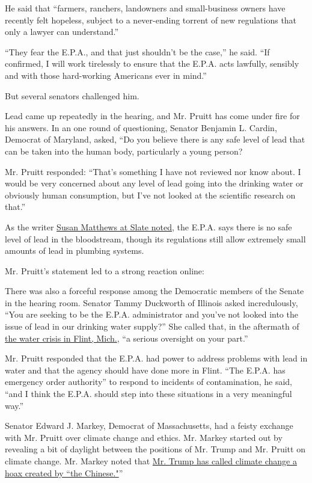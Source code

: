 He said that ``farmers, ranchers, landowners and small-business owners
have recently felt hopeless, subject to a never-ending torrent of new
regulations that only a lawyer can understand.''

``They fear the E.P.A., and that just shouldn't be the case,'' he said.
``If confirmed, I will work tirelessly to ensure that the E.P.A. acts
lawfully, sensibly and with those hard-working Americans ever in mind.''

But several senators challenged him.

Lead came up repeatedly in the hearing, and Mr. Pruitt has come under
fire for his answers. In an one round of questioning, Senator Benjamin
L. Cardin, Democrat of Maryland, asked, ``Do you believe there is any
safe level of lead that can be taken into the human body, particularly a
young person?

Mr. Pruitt responded: ``That's something I have not reviewed nor know
about. I would be very concerned about any level of lead going into the
drinking water or obviously human consumption, but I've not looked at
the scientific research on that.''

As the writer
\href{http://www.slate.com/blogs/the_slatest/2017/01/18/scott_pruitt_s_answer_on_lead_in_water_wasn_t_that_egregious.html}{Susan
Matthews at Slate noted}, the E.P.A. says there is no safe level of lead
in the bloodstream, though its regulations still allow extremely small
amounts of lead in plumbing systems.

Mr. Pruitt's statement led to a strong reaction online:

There was also a forceful response among the Democratic members of the
Senate in the hearing room. Senator Tammy Duckworth of Illinois asked
incredulously, ``You are seeking to be the E.P.A. administrator and
you've not looked into the issue of lead in our drinking water supply?''
She called that, in the aftermath of
\href{https://www.nytimes.com/2016/01/24/us/when-the-water-turned-brown.html}{the
water crisis in Flint, Mich.}, ``a serious oversight on your part.''

Mr. Pruitt responded that the E.P.A. had power to address problems with
lead in water and that the agency should have done more in Flint. ``The
E.P.A. has emergency order authority'' to respond to incidents of
contamination, he said, ``and I think the E.P.A. should step into these
situations in a very meaningful way.''

Senator Edward J. Markey, Democrat of Massachusetts, had a feisty
exchange with Mr. Pruitt over climate change and ethics. Mr. Markey
started out by revealing a bit of daylight between the positions of Mr.
Trump and Mr. Pruitt on climate change. Mr. Markey noted that
\href{https://twitter.com/realdonaldtrump/status/265895292191248385?lang=en}{Mr.
Trump has called climate change a hoax created by ``the Chinese."}''


